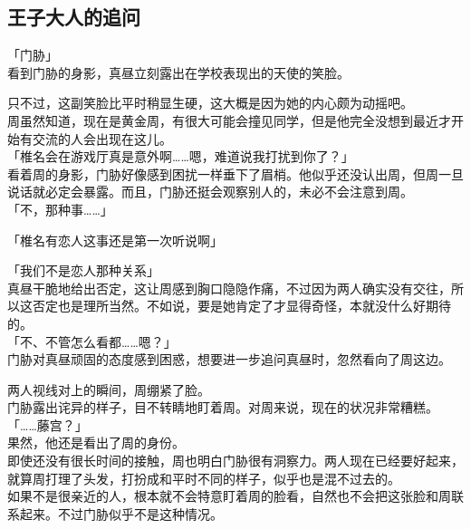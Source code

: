 \subsection{王子大人的追问}

「门胁」\\

看到门胁的身影，真昼立刻露出在学校表现出的天使的笑脸。

只不过，这副笑脸比平时稍显生硬，这大概是因为她的内心颇为动摇吧。\\

周虽然知道，现在是黄金周，有很大可能会撞见同学，但是他完全没想到最近才开始有交流的人会出现在这儿。\\

「椎名会在游戏厅真是意外啊……嗯，难道说我打扰到你了？」\\

看着周的身影，门胁好像感到困扰一样垂下了眉梢。他似乎还没认出周，但周一旦说话就必定会暴露。而且，门胁还挺会观察别人的，未必不会注意到周。\\

「不，那种事……」

「椎名有恋人这事还是第一次听说啊」

「我们不是恋人那种关系」\\

真昼干脆地给出否定，这让周感到胸口隐隐作痛，不过因为两人确实没有交往，所以这否定也是理所当然。不如说，要是她肯定了才显得奇怪，本就没什么好期待的。\\

「不、不管怎么看都……嗯？」\\

门胁对真昼顽固的态度感到困惑，想要进一步追问真昼时，忽然看向了周这边。

两人视线对上的瞬间，周绷紧了脸。\\

门胁露出诧异的样子，目不转睛地盯着周。对周来说，现在的状况非常糟糕。\\

「……藤宫？」\\

果然，他还是看出了周的身份。\\

即使还没有很长时间的接触，周也明白门胁很有洞察力。两人现在已经要好起来，就算周打理了头发，打扮成和平时不同的样子，似乎也是混不过去的。\\

如果不是很亲近的人，根本就不会特意盯着周的脸看，自然也不会把这张脸和周联系起来。不过门胁似乎不是这种情况。\\

